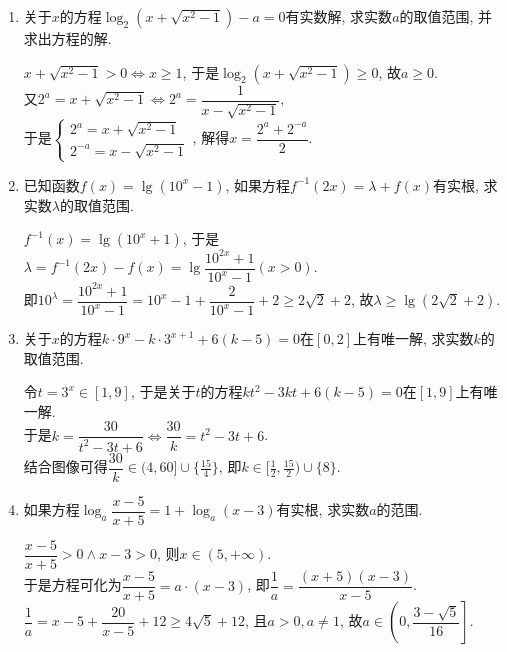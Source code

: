 \begin{enumerate}
    \item 关于$x$的方程$\log_2(x+\sqrt{x^2-1})-a=0$有实数解, 求实数$a$的取值范围, 并求出方程的解.
    \begin{jieda}
    $x+\sqrt{x^2-1}>0\iff x\geq 1$, 于是$\log_2(x+\sqrt{x^2-1})\geq 0$, 故$a\geq 0$. \\
    又$2^a=x+\sqrt{x^2-1}\iff 2^a=\dfrac{1}{x-\sqrt{x^2-1}}$, \\
    于是$\begin{cases}
    2^a=x+\sqrt{x^2-1}\\
    2^{-a}=x-\sqrt{x^2-1}
    \end{cases}$, 
    解得$x=\dfrac{2^a+2^{-a}}{2}$. 
    \end{jieda}
    \begin{vspace_}
        \vsp[3]
    \end{vspace_}
    
    \item 已知函数$f(x)=\lg(10^x-1)$, 如果方程$f^{-1}(2x)=\lambda+f(x)$有实根, 求实数$\lambda$的取值范围. 
    \begin{jieda}
    $f^{-1}(x)=\lg(10^x+1)$, 于是$\lambda=f^{-1}(2x)-f(x)=\lg\dfrac{10^{2x}+1}{10^x-1}(x>0)$. \\
    即$10^{\lambda}=\dfrac{10^{2x}+1}{10^x-1}=10^x-1+\dfrac{2}{10^x-1}+2\geq 2\sqrt{2}+2$, 故$\lambda\geq\lg(2\sqrt{2}+2)$. 
    \end{jieda}
    \begin{vspace_}
        \vsp[3]
    \end{vspace_}
    
    \item 关于$x$的方程$k\cdot9^x-k\cdot3^{x+1}+6(k-5)=0$在$[0,2]$上有唯一解, 求实数$k$的取值范围. 
    \begin{jieda}
    令$t=3^x\in[1,9]$, 于是关于$t$的方程$kt^2-3kt+6(k-5)=0$在$[1,9]$上有唯一解. \\
    于是$k=\dfrac{30}{t^2-3t+6}\iff\dfrac{30}{k}=t^2-3t+6$. \\
    结合图像可得$\dfrac{30}{k}\in(4,60]\cup\{\frac{15}{4}\}$, 即$k\in[\frac{1}{2},\frac{15}{2})\cup\{8\}$. 
    \end{jieda}
    \begin{vspace_}
        \vsp[3]
    \end{vspace_}

    \item 如果方程$\log_a\dfrac{x-5}{x+5}=1+\log_a(x-3)$有实根, 求实数$a$的范围. 
    \begin{jieda}
    $\dfrac{x-5}{x+5}>0\land x-3>0$, 则$x\in(5,+\infty)$. \\
    于是方程可化为$\dfrac{x-5}{x+5}=a\cdot(x-3)$, 即$\dfrac{1}{a}=\dfrac{(x+5)(x-3)}{x-5}$. \\
    $\dfrac{1}{a}=x-5+\dfrac{20}{x-5}+12\geq4\sqrt{5}+12$, 且$a>0,a\neq 1$, 故$a\in\left(0,\dfrac{3-\sqrt{5}}{16}\right]$. 
    \end{jieda}
    \begin{vspace_}
        \vsp[3]
    \end{vspace_}
    

\end{enumerate}
